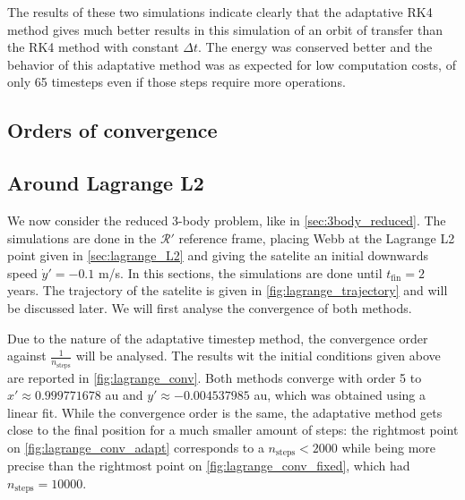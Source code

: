 The results of these two simulations indicate clearly that the adaptative RK4 method gives much better results in this simulation of an orbit of transfer than the RK4 method with constant $\Delta t$. The energy was conserved better and the behavior of this adaptative method was as expected for low computation costs, of only 65 timesteps even if those steps require more operations.

\subsection{Orders of convergence}









\subsection{Around Lagrange L2}

We now consider the reduced 3-body problem, like in \ref{sec:3body_reduced}. The simulations are done in the \(\mathcal R'\) reference frame, placing Webb at the Lagrange L2 point given in \ref{sec:lagrange_L2} and giving the satelite an initial downwards speed \(\dot y' = -0.1\) m/s. In this sections, the simulations are done until \(t_\textrm{fin} = 2\) years. The trajectory of the satelite is given in \autoref{fig:lagrange_trajectory} and will be discussed later. We will first analyse the convergence of both methods.

Due to the nature of the adaptative timestep method, the convergence order against \(\frac{1}{n_\textrm{steps}}\) will be analysed. The results wit the initial conditions given above are reported in \autoref{fig:lagrange_conv}. Both methods converge with order 5 to \(x' \approx 0.999771678\) au and \(y' \approx -0.004537985\) au, which was obtained using a linear fit. While the convergence order is the same, the adaptative method gets close to the final position for a much smaller amount of steps: the rightmost point on \autoref{fig:lagrange_conv_adapt} corresponds to a \(n_\textrm{steps} < 2000\) while being more precise than the rightmost point on \autoref{fig:lagrange_conv_fixed}, which had \(n_\textrm{steps} = 10000\).

